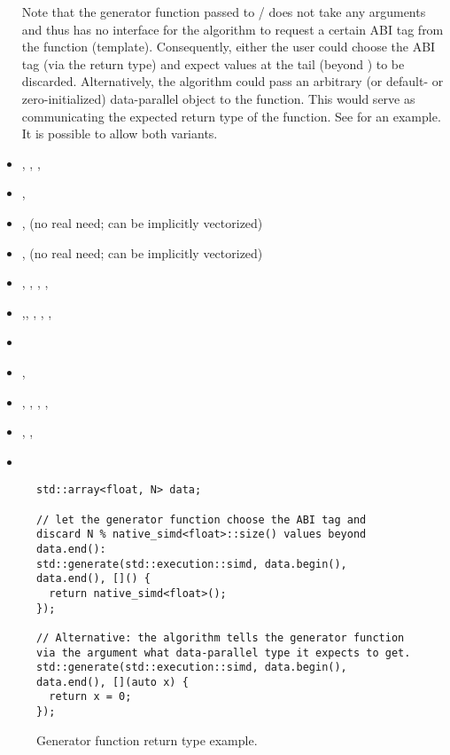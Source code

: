 \begin{itemize}
    Note that the generator function passed to / does not take any arguments and thus has no interface for the algorithm to request a certain ABI tag from the function (template).
    Consequently, either the user could choose the ABI tag (via the return type) and expect values at the tail (beyond ) to be discarded.
    Alternatively, the algorithm could pass an arbitrary (or default- or zero-initialized) data-parallel object to the function.
    This would serve as communicating the expected return type of the function.
    See  for an example.
    It is possible to allow both variants.
  \item {}, , , 
  \item {}, 
  \item {},  (no real need; can be implicitly vectorized)
  \item {},  (no real need; can be implicitly vectorized)
  \item {}, , , , 
  \item {},, , , , 
  \item {}
  \item {}, 
  \item {}, , , , 
  \item {}, , 
  \item {}
\end{itemize}

\begin{figure}[bt]
\begin{lstlisting}
std::array<float, N> data;

// let the generator function choose the ABI tag and discard N % native_simd<float>::size() values beyond data.end():
std::generate(std::execution::simd, data.begin(), data.end(), []() {
  return native_simd<float>();
});

// Alternative: the algorithm tells the generator function via the argument what data-parallel type it expects to get.
std::generate(std::execution::simd, data.begin(), data.end(), [](auto x) {
  return x = 0;
});
\end{lstlisting}
  \caption{Generator function return type example.}
  \label{fig:generate example}
\end{figure}

